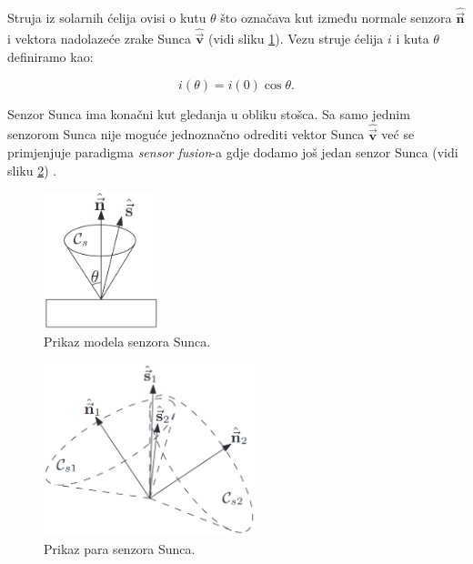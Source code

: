 \documentclass[times, utf8, diplomski, numeric]{templates/template}
\begin{document}
{{{{                Struja iz solarnih ćelija ovisi o kutu $\theta$ što označava kut između normale senzora $\hat{\overrightarrow{\boldsymbol{n}}}$ i vektora nadolazeće zrake Sunca $\hat{\overrightarrow{\boldsymbol{v}}}$ (vidi sliku \ref{fig:sensor_sunca}). Vezu struje ćelija $i$ i kuta $\theta$ definiramo kao:

                \begin{equation}
                    i(\theta) = i(0)\cos\theta.
                \end{equation}

                Senzor Sunca ima konačni kut gledanja u obliku stošca. Sa samo jednim senzorom Sunca nije moguće jednoznačno odrediti vektor Sunca $\hat{\overrightarrow{\boldsymbol{v}}}$ već se primjenjuje paradigma \emph{sensor fusion}-a gdje dodamo još jedan senzor Sunca (vidi sliku \ref{fig:sensor_sunca_sensor_fusion}) \cite{adcsKnjiga}.

                \begin{figure}[htb]
                \centering
                \includegraphics[width=0.3\textwidth]{images/sensor_sunca.png}
                \caption{Prikaz modela senzora Sunca.}
                \label{fig:sensor_sunca}
                \end{figure}

                \begin{figure}[htb]
                \centering
                \includegraphics[width=0.55\textwidth]{images/sensor_sunca_sensor_fusion.png}
                \caption{Prikaz para senzora Sunca.}
                \label{fig:sensor_sunca_sensor_fusion}
                \end{figure}
            }

}}}
\end{document}
